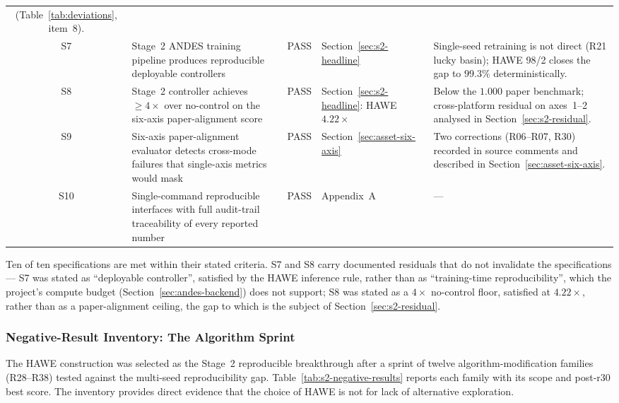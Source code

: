 \documentclass{unnc-fyp}
\begin{document}
\begin{table}[tb]
\begin{tabular}{@{}cp{4.0cm}cp{2.7cm}p{3.4cm}@{}}
         (Table~\ref{tab:deviations}, item~8). \\
    S7 & Stage~2 ANDES training pipeline produces reproducible
         deployable controllers
       & PASS
       & Section~\ref{sec:s2-headline}
       & Single-seed retraining is not direct (R21 lucky basin);
         HAWE 98/2 closes the gap to $99.3\%$ deterministically. \\
    S8 & Stage~2 controller achieves $\geq 4\times$ over
         no-control on the six-axis paper-alignment score
       & PASS
       & Section~\ref{sec:s2-headline}: HAWE $4.22\times$
       & Below the $1.000$ paper benchmark; cross-platform
         residual on axes~1--2 analysed in
         Section~\ref{sec:s2-residual}. \\
    S9 & Six-axis paper-alignment evaluator detects cross-mode
         failures that single-axis metrics would mask
       & PASS
       & Section~\ref{sec:asset-six-axis}
       & Two corrections (R06--R07, R30) recorded in
         source comments and described in
         Section~\ref{sec:asset-six-axis}. \\
    S10 & Single-command reproducible interfaces with full
          audit-trail traceability of every reported number
       & PASS
       & Appendix~A
       & --- \\
    \bottomrule
  \end{tabular}
\end{table}

Ten of ten specifications are met within their stated criteria.
S7 and S8 carry documented residuals that do not invalidate the
specifications --- S7 was stated as ``deployable controller'',
satisfied by the HAWE inference rule, rather than as
``training-time reproducibility'', which the project's compute
budget (Section~\ref{sec:andes-backend}) does not support; S8 was
stated as a $4\times$ no-control floor, satisfied at $4.22\times$,
rather than as a paper-alignment ceiling, the gap to which is the
subject of Section~\ref{sec:s2-residual}.

\subsubsection{Negative-Result Inventory: The Algorithm Sprint}
\label{sec:s2-negative-results}

The HAWE construction was selected as the Stage~2 reproducible
breakthrough after a sprint of twelve algorithm-modification
families (R28--R38) tested against the multi-seed reproducibility
gap.
Table~\ref{tab:s2-negative-results} reports each family with its
scope and post-r30 best score.
The inventory provides direct evidence that the choice of HAWE is
not for lack of alternative exploration.
\end{document}

